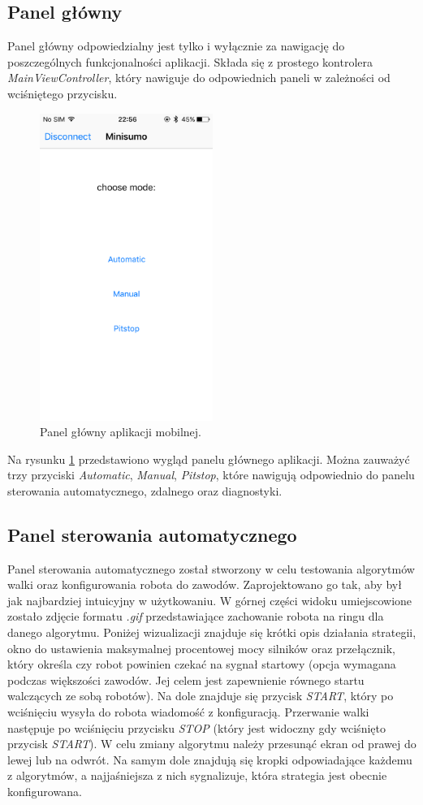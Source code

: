 \subsection{Panel główny}
Panel główny odpowiedzialny jest tylko i wyłącznie za nawigację do poszczególnych funkcjonalności aplikacji. Składa się z prostego kontrolera \textit{MainViewController}, który nawiguje do odpowiednich paneli w zależności od wciśniętego przycisku.

\begin{figure}[H]
	\centering
		\includegraphics[width=0.75\linewidth, height=10cm, keepaspectratio, fbox]{pic05/main.PNG}
	\caption{Panel główny aplikacji mobilnej.}
	\label{fig:mainview}	
\end{figure}

Na rysunku \ref{fig:mainview} przedstawiono wygląd panelu głównego aplikacji. Można zauważyć trzy przyciski \textit{Automatic}, \textit{Manual}, \textit{Pitstop}, które nawigują odpowiednio do panelu sterowania automatycznego, zdalnego oraz diagnostyki. 

\subsection{Panel sterowania automatycznego}
Panel sterowania automatycznego został stworzony w celu testowania algorytmów walki oraz konfigurowania robota do zawodów. Zaprojektowano go tak, aby był jak najbardziej intuicyjny w użytkowaniu. W górnej części widoku umiejscowione zostało zdjęcie formatu \textit{.gif} przedstawiające zachowanie robota na ringu dla danego algorytmu. Poniżej wizualizacji znajduje się krótki opis działania strategii, okno do ustawienia maksymalnej procentowej mocy silników oraz przełącznik, który określa czy robot powinien czekać na sygnał startowy (opcja wymagana podczas większości zawodów. Jej celem jest zapewnienie równego startu walczących ze sobą robotów). Na dole znajduje się przycisk \textit{START}, który po wciśnięciu wysyła do robota wiadomość z konfiguracją. Przerwanie walki następuje po wciśnięciu przycisku \textit{STOP} (który jest widoczny gdy wciśnięto przycisk \textit{START}).  W celu zmiany algorytmu należy przesunąć ekran od prawej do lewej lub na odwrót. Na samym dole znajdują się kropki odpowiadające każdemu z algorytmów, a najjaśniejsza z nich sygnalizuje, która strategia jest obecnie konfigurowana.

